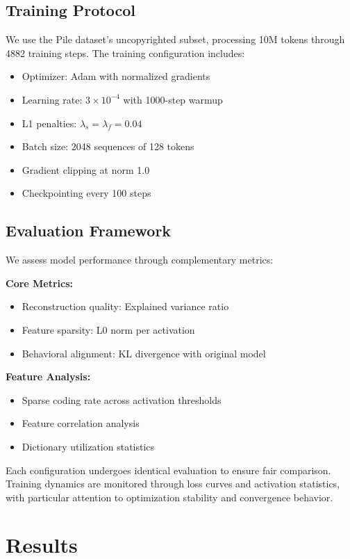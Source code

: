 \documentclass{article} %
\begin{document}
\subsection{Training Protocol}
We use the Pile dataset's uncopyrighted subset, processing 10M tokens through 4882 training steps. The training configuration includes:
\begin{itemize}
    \item Optimizer: Adam with normalized gradients
    \item Learning rate: $3 \times 10^{-4}$ with 1000-step warmup
    \item L1 penalties: $\lambda_s = \lambda_f = 0.04$
    \item Batch size: 2048 sequences of 128 tokens
    \item Gradient clipping at norm 1.0
    \item Checkpointing every 100 steps
\end{itemize}

\subsection{Evaluation Framework}
We assess model performance through complementary metrics:

\textbf{Core Metrics:}
\begin{itemize}
    \item Reconstruction quality: Explained variance ratio
    \item Feature sparsity: L0 norm per activation
    \item Behavioral alignment: KL divergence with original model
\end{itemize}

\textbf{Feature Analysis:}
\begin{itemize}
    \item Sparse coding rate across activation thresholds
    \item Feature correlation analysis
    \item Dictionary utilization statistics
\end{itemize}

Each configuration undergoes identical evaluation to ensure fair comparison. Training dynamics are monitored through loss curves and activation statistics, with particular attention to optimization stability and convergence behavior.

\section{Results}
\label{sec:results}
\end{document}
